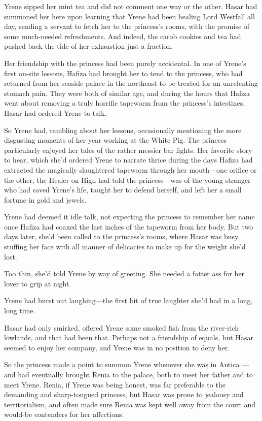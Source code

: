 Yrene sipped her mint tea and did not comment one way or the other. Hasar had summoned her here upon learning that Yrene had been healing Lord Westfall all day, sending a servant to fetch her to the princess's rooms, with the promise of some much-needed refreshments. And indeed, the carob cookies and tea had pushed back the tide of her exhaustion just a fraction.

Her friendship with the princess had been purely accidental. In one of Yrene's first on-site lessons, Hafiza had brought her to tend to the princess, who had returned from her seaside palace in the northeast to be treated for an unrelenting stomach pain. They were both of similar age, and during the hours that Hafiza went about removing a truly horrific tapeworm from the princess's intestines, Hasar had ordered Yrene to talk.

So Yrene had, rambling about her lessons, occasionally mentioning the more disgusting moments of her year working at the White Pig. The princess particularly enjoyed her tales of the rather messier bar fights. Her favorite story to hear, which she'd ordered Yrene to narrate thrice during the days Hafiza had extracted the magically slaughtered tapeworm through her mouth---one orifice or the other, the Healer on High had told the princess---was of the young stranger who had saved Yrene's life, taught her to defend herself, and left her a small fortune in gold and jewels.

Yrene had deemed it idle talk, not expecting the princess to remember her name once Hafiza had coaxed the last inches of the tapeworm from her body. But two days later, she'd been called to the princess's rooms, where Hasar was busy stuffing her face with all manner of delicacies to make up for the weight she'd lost.

Too thin, she'd told Yrene by way of greeting. She needed a fatter ass for her lover to grip at night.

Yrene had burst out laughing---the first bit of true laughter she'd had in a long, long time.

Hasar had only smirked, offered Yrene some smoked fish from the river-rich lowlands, and that had been that. Perhaps not a friendship of equals, but Hasar seemed to enjoy her company, and Yrene was in no position to deny her.

So the princess made a point to summon Yrene whenever she was in Antica ---and had eventually brought Renia to the palace, both to meet her father and to meet Yrene. Renia, if Yrene was being honest, was far preferable to the demanding and sharp-tongued princess, but Hasar was prone to jealousy and territorialism, and often made sure Renia was kept well away from the court and would-be contenders for her affections.

